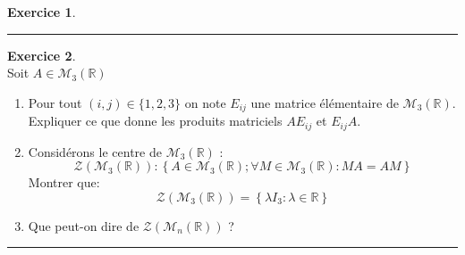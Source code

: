 \documentclass[a4paper,10pt]{article}
\theoremstyle{definition}
\theoremstyle{definition}
\newtheorem{exo}{Exercice}
\newcommand{\R}{\mathbb{R}}
\begin{document}
\begin{minipage}{1\linewidth}
\begin{minipage}[t]{0.48\linewidth}
\begin{exo}
\centering\rule{1\linewidth}{0.6pt}
\end{exo}

\begin{exo}\quad\\
Soit  $A\in\mathcal{M}_{3}\left(\R\right)$ 
\begin{enumerate}
\item Pour tout $(i,j)\in\{1,2,3\}$ on note $E_{ij}$ une matrice élémentaire de $\mathcal{M}_{3}\left(\R\right)$. Expliquer ce que donne les produits matriciels $ AE_{ij}$ et $E_{ij}A$. 
\item Considérons le centre de $\mathcal{M}_{3}\left(\R\right)$ :
 $$ \mathcal{Z}\left(\mathcal{M}_{3}\left(\R\right)\right) : \left\{A\in\mathcal{M}_{3}\left(\R\right); \forall M\in\mathcal{M}_{3}\left(\R\right)  : MA  = AM \right \}$$
 Montrer que: 
 $$\mathcal{Z}\left(\mathcal{M}_{3}\left(\R\right)\right) = \left\{\lambda I_3 : \lambda\in\R \right \}$$
 \item Que peut-on dire de $\mathcal{Z}\left(\mathcal{M}_{n}\left(\R\right)\right) $ ?
 
\end{enumerate}
\centering
\rule{1\linewidth}{0.6pt}
\end{exo}




\end{minipage}
\end{minipage}
\end{document}
